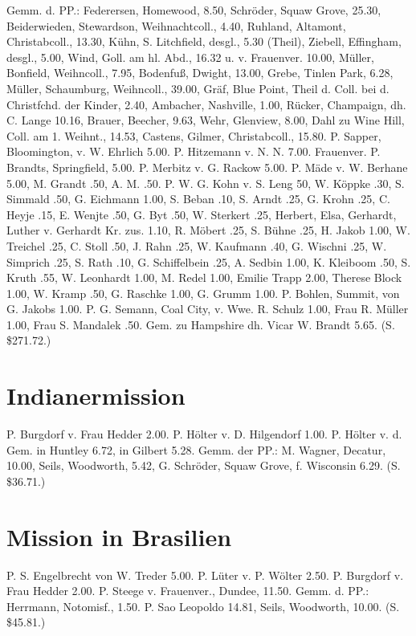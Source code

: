 Gemm. d. PP.: Federersen, Homewood, 8.50, Schröder, Squaw Grove, 25.30, Beiderwieden, Stewardson, Weihnachtcoll., 4.40, Ruhland, Altamont, Christabcoll., 13.30, Kühn, S. Litchfield, desgl., 5.30 (Theil), Ziebell, Effingham, desgl., 5.00, Wind, Goll. am hl. Abd., 16.32 u. v. Frauenver. 10.00, Müller, Bonfield, Weihncoll., 7.95, Bodenfuß, Dwight, 13.00, Grebe, Tinlen Park, 6.28, Müller, Schaumburg, Weihncoll., 39.00, Gräf, Blue Point, Theil d. Coll. bei d. Christfchd. der Kinder, 2.40, Ambacher, Nashville, 1.00, Rücker, Champaign, dh. C. Lange 10.16, Brauer, Beecher, 9.63, Wehr, Glenview, 8.00, Dahl zu Wine Hill, Coll. am 1. Weihnt., 14.53, Castens, Gilmer, Christabcoll., 15.80. P. Sapper, Bloomington, v. W. Ehrlich 5.00. P. Hitzemann v. N. N. 7.00. Frauenver. P. Brandts, Springfield, 5.00. P. Merbitz v. G. Rackow 5.00. P. Mäde v. W. Berhane 5.00, M. Grandt .50, A. M. .50. P. W. G. Kohn v. S. Leng 50, W. Köppke .30, S. Simmald .50, G. Eichmann 1.00, S. Beban .10, S. Arndt .25, G. Krohn .25, C. Heyje .15, E. Wenjte .50, G. Byt .50, W. Sterkert .25, Herbert, Elsa, Gerhardt, Luther v. Gerhardt Kr. zus. 1.10, R. Möbert .25, S. Bühne .25, H. Jakob 1.00, W. Treichel .25, C. Stoll .50, J. Rahn .25, W. Kaufmann .40, G. Wischni .25, W. Simprich .25, S. Rath .10, G. Schiffelbein .25, A. Sedbin 1.00, K. Kleiboom .50, S. Kruth .55, W. Leonhardt 1.00, M. Redel 1.00, Emilie Trapp 2.00, Therese Block 1.00, W. Kramp .50, G. Raschke 1.00, G. Grumm 1.00. P. Bohlen, Summit, von G. Jakobs 1.00. P. G. Semann, Coal City, v. Wwe. R. Schulz 1.00, Frau R. Müller 1.00, Frau S. Mandalek .50. Gem. zu Hampshire dh. Vicar W. Brandt 5.65. (S. \$271.72.)

\section{Indianermission}

P. Burgdorf v. Frau Hedder 2.00. P. Hölter v. D. Hilgendorf 1.00. P. Hölter v. d. Gem. in Huntley 6.72, in Gilbert 5.28. Gemm. der PP.: M. Wagner, Decatur, 10.00, Seils, Woodworth, 5.42, G. Schröder, Squaw Grove, f. Wisconsin 6.29. (S. \$36.71.)

\section{Mission in Brasilien}

P. S. Engelbrecht von W. Treder 5.00. P. Lüter v. P. Wölter 2.50. P. Burgdorf v. Frau Hedder 2.00. P. Steege v. Frauenver., Dundee, 11.50. Gemm. d. PP.: Herrmann, Notomisf., 1.50. P. Sao Leopoldo 14.81, Seils, Woodworth, 10.00. (S. \$45.81.)

